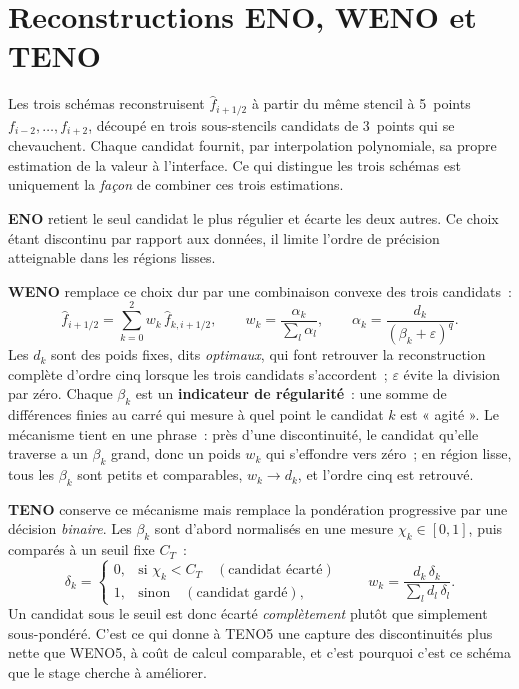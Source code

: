 \documentclass[12pt,a4paper,oneside]{report}
\begin{document}
\section{Reconstructions ENO, WENO et TENO}
\label{sec:fond-schemas}

Les trois schémas reconstruisent $\hat f_{i+1/2}$ à partir du même stencil à
5~points $f_{i-2},\dots,f_{i+2}$, découpé en trois sous-stencils candidats de
3~points qui se chevauchent. Chaque candidat fournit, par interpolation
polynomiale, sa propre estimation de la valeur à l'interface. Ce qui distingue
les trois schémas est uniquement la \emph{façon} de combiner ces trois
estimations.

\textbf{ENO} \cite{harten1987} retient le seul candidat le plus régulier et
écarte les deux autres. Ce choix étant discontinu par rapport aux données, il
limite l'ordre de précision atteignable dans les régions lisses.

\textbf{WENO} \cite{jiang1996} remplace ce choix dur par une combinaison
convexe des trois candidats~:
\[
\hat f_{i+1/2} = \sum_{k=0}^{2} w_k\, \hat f_{k,i+1/2}, \qquad
w_k = \frac{\alpha_k}{\sum_{l}\alpha_l}, \qquad
\alpha_k = \frac{d_k}{(\beta_k + \varepsilon)^{q}} .
\]
Les $d_k$ sont des poids fixes, dits \emph{optimaux}, qui font retrouver la
reconstruction complète d'ordre cinq lorsque les trois candidats s'accordent~;
$\varepsilon$ évite la division par zéro. Chaque $\beta_k$ est un
\textbf{indicateur de régularité}~: une somme de différences finies au carré
qui mesure à quel point le candidat $k$ est « agité ». Le mécanisme tient en
une phrase~: près d'une discontinuité, le candidat qu'elle traverse a un
$\beta_k$ grand, donc un poids $w_k$ qui s'effondre vers zéro~; en région
lisse, tous les $\beta_k$ sont petits et comparables, $w_k \to d_k$, et
l'ordre cinq est retrouvé.

\textbf{TENO} \cite{fu2016} conserve ce mécanisme mais remplace la pondération
progressive par une décision \emph{binaire}. Les $\beta_k$ sont d'abord
normalisés en une mesure $\chi_k \in [0,1]$, puis comparés à un seuil fixe
$C_T$~:
\[
\delta_k = \begin{cases} 0, & \text{si } \chi_k < C_T \quad (\text{candidat écarté}) \\[2pt]
                         1, & \text{sinon} \quad (\text{candidat gardé}), \end{cases}
\qquad
w_k = \frac{d_k\,\delta_k}{\sum_{l}d_l\,\delta_l} .
\]
Un candidat sous le seuil est donc écarté \emph{complètement} plutôt que
simplement sous-pondéré. C'est ce qui donne à TENO5 une capture des
discontinuités plus nette que WENO5, à coût de calcul comparable, et c'est
pourquoi c'est ce schéma que le stage cherche à améliorer.
\end{document}
